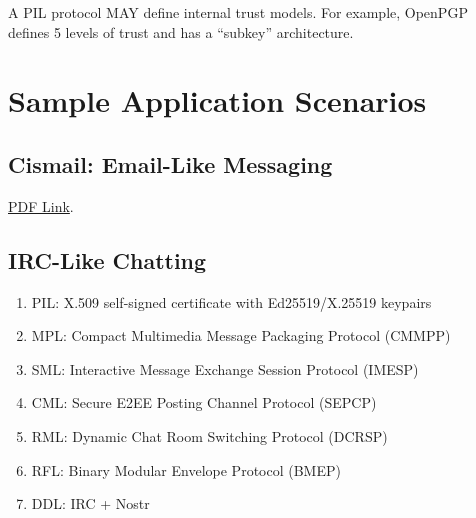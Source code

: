 \documentclass[a4paper,11pt]{article}
\begin{document}
A PIL protocol MAY define internal trust models. For example, OpenPGP defines 5 levels of trust and has a ``subkey'' architecture.




\section{Sample Application Scenarios}

\subsection{Cismail: Email-Like Messaging}

\href{https://pub-714f8d634e8f451d9f2fe91a4debfa23.r2.dev/keep/ntexdb/note-20230210-cismail.pdf--9f1bb76e5b1938be3c8907311238dbc0.pdf}{PDF Link}.

\subsection{IRC-Like Chatting}

\begin{enumerate}
	\item PIL: X.509 self-signed certificate with Ed25519/X.25519 keypairs
	\item MPL: Compact Multimedia Message Packaging Protocol (CMMPP)
	\item SML: Interactive Message Exchange Session Protocol (IMESP)
	\item CML: Secure E2EE Posting Channel Protocol (SEPCP)
	\item RML: Dynamic Chat Room Switching Protocol (DCRSP)
	\item RFL: Binary Modular Envelope Protocol (BMEP)
	\item DDL: IRC + Nostr
\end{enumerate}
\end{document}
